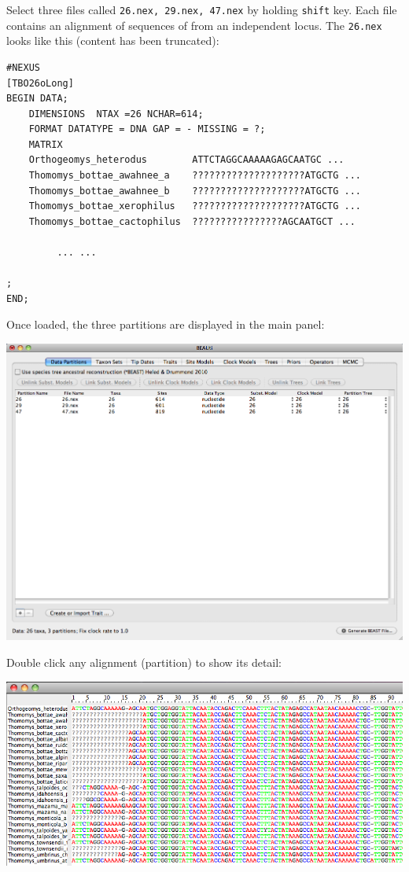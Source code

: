 \documentclass[12pt]{article}
\begin{document}
\medskip{}

Select three files called \texttt{26.nex, 29.nex, 47.nex} by holding \texttt{shift} key. Each file contains an alignment of sequences of from an independent locus. The \texttt{26.nex} looks like this (content has been truncated):

\begin{verbatim}
#NEXUS
[TBO26oLong]
BEGIN DATA;
	DIMENSIONS  NTAX =26 NCHAR=614;
	FORMAT DATATYPE = DNA GAP = - MISSING = ?;
	MATRIX	
	Orthogeomys_heterodus        ATTCTAGGCAAAAAGAGCAATGC ...
	Thomomys_bottae_awahnee_a    ????????????????????ATGCTG ...
	Thomomys_bottae_awahnee_b    ????????????????????ATGCTG ...
	Thomomys_bottae_xerophilus   ????????????????????ATGCTG ...
	Thomomys_bottae_cactophilus  ????????????????AGCAATGCT ...

         ... ...

;
END;
\end{verbatim}

\medskip{}

Once loaded, the three partitions are displayed in the main panel:

\medskip{}

\includegraphics[scale=0.4]{figures/BEAUti_DataPartitions}

\medskip{}

Double click any alignment (partition) to show its detail:

\medskip{}

\includegraphics[scale=0.4]{figures/BEAUti_ShowAlignment}
\end{document}
